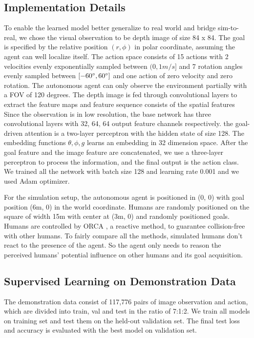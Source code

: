 \documentclass[10pt,twocolumn,letterpaper]{article}
\begin{document}
\subsection{Implementation Details}
To enable the learned model better generalize to real world and bridge sim-to-real, we chose the visual observation to be depth image of size 84 x 84. The goal is specified by the relative position $(r, \phi)$ in polar coordinate, assuming the agent can well localize itself. The action space consists of 15 actions with 2 velocities evenly exponentially sampled between $(0, 1m/s]$ and 7 rotation angles evenly sampled between $[-60\degree, 60\degree]$ and one action of zero velocity and zero rotation. The autonomous agent can only observe the environment partially with a FOV of 120 degrees. The depth image is fed through convolutional layers to extract the feature maps and feature sequence consists of the spatial features Since the observation is in low resolution, the base network has three convolutional layers with 32, 64, 64 output feature channels respectively. the goal-driven attention is a two-layer perceptron with the hidden state of size 128. The embedding functions $\theta, \phi, g$ learns an embedding in 32 dimension space. After the goal feature and the image feature are concatenated, we use a three-layer perceptron to process the information, and the final output is the action class. We trained all the network with batch size 128 and learning rate 0.001 and we used Adam \cite{} optimizer.

For the simulation setup, the autonomous agent is positioned in (0, 0) with goal position (6m, 0) in the world coordinate. Humans are randomly positioned on the square of width 15m with center at (3m, 0) and randomly positioned goals. Humans are controlled by ORCA \cite{orca}, a reactive method, to guarantee collision-free with other humans. To fairly compare all the methods, simulated humans don't react to the presence of the agent. So the agent only needs to reason the perceived humans' potential influence on other humans and its goal acquisition.

\subsection{Supervised Learning on Demonstration Data}
The demonstration data consist of 117,776 pairs of image observation and action, which are divided into train, val and test in the ratio of 7:1:2. We train all models on training set and test them on the held-out validation set. The final test loss and accuracy is evaluated with the best model on validation set. 
\end{document}
